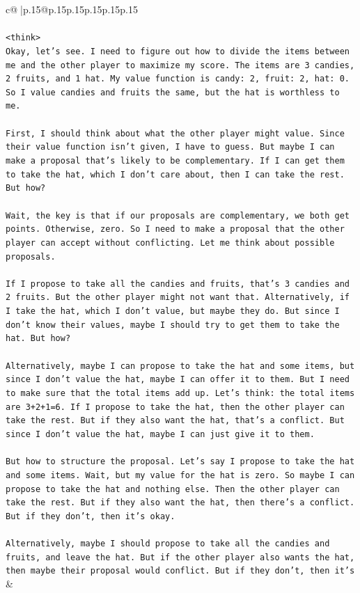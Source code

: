 \documentclass{article}
\begin{document}
{\begin{supertabular}{c@{$\;$}|p{.15\linewidth}@{}p{.15\linewidth}p{.15\linewidth}p{.15\linewidth}p{.15\linewidth}p{.15\linewidth}}
{{{\\ 
\\ 
\texttt{<think>} \\
\texttt{Okay, let's see. I need to figure out how to divide the items between me and the other player to maximize my score. The items are 3 candies, 2 fruits, and 1 hat. My value function is candy: 2, fruit: 2, hat: 0. So I value candies and fruits the same, but the hat is worthless to me. } \\
\\ 
\texttt{First, I should think about what the other player might value. Since their value function isn't given, I have to guess. But maybe I can make a proposal that's likely to be complementary. If I can get them to take the hat, which I don't care about, then I can take the rest. But how?} \\
\\ 
\texttt{Wait, the key is that if our proposals are complementary, we both get points. Otherwise, zero. So I need to make a proposal that the other player can accept without conflicting. Let me think about possible proposals.} \\
\\ 
\texttt{If I propose to take all the candies and fruits, that's 3 candies and 2 fruits. But the other player might not want that. Alternatively, if I take the hat, which I don't value, but maybe they do. But since I don't know their values, maybe I should try to get them to take the hat. But how?} \\
\\ 
\texttt{Alternatively, maybe I can propose to take the hat and some items, but since I don't value the hat, maybe I can offer it to them. But I need to make sure that the total items add up. Let's think: the total items are 3+2+1=6. If I propose to take the hat, then the other player can take the rest. But if they also want the hat, that's a conflict. But since I don't value the hat, maybe I can just give it to them. } \\
\\ 
\texttt{But how to structure the proposal. Let's say I propose to take the hat and some items. Wait, but my value for the hat is zero. So maybe I can propose to take the hat and nothing else. Then the other player can take the rest. But if they also want the hat, then there's a conflict. But if they don't, then it's okay. } \\
\\ 
\texttt{Alternatively, maybe I should propose to take all the candies and fruits, and leave the hat. But if the other player also wants the hat, then maybe their proposal would conflict. But if they don't, then it's} \\
            }
        }
    }
    & \\ \\


\end{supertabular}}
\end{document}
